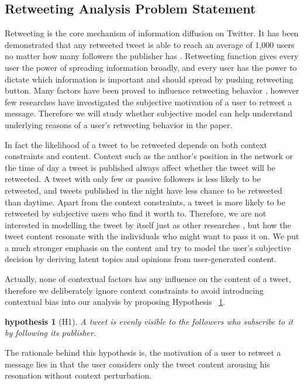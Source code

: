 \documentclass{acm_proc_article-sp}
\newtheorem{hypothesis}{hypothesis}
\begin{document}
\subsection{Retweeting Analysis Problem Statement}
\label{statement}
Retweeting is the core mechanism of information diffusion on Twitter. It has been demonstrated that any retweeted tweet is able to reach an average of 1,000 users no matter how many followers the publisher has \cite{Kwak:2010TSN}. Retweeting function gives every user the power of spreading information broadly, and every user has the power to dictate which information is important and should spread by pushing retweeting button. Many factors have been proved to influence retweeting behavior \cite{Suh2010,conf/icwsm/MacskassyM11,Comarela:2012UFA}, however few researches have investigated the subjective motivation of a user to retweet a message. Therefore we will study whether subjective model can help understand underlying reasons of a user's retweeting behavior in the paper.

In fact the likelihood of a tweet to be retweeted depends on both context constraints and content. 
Context such as the author's position in the network or the time of day a tweet is published always affect whether the tweet will be retweeted. A tweet with only few or passive followers is less likely to be retweeted, and tweets published in the night have less chance to be retweeted than daytime.
Apart from the context constraints, a tweet is more likely to be retweeted by subjective users who find it worth to. Therefore, we are not interested in modelling the tweet by itself just as other researches \cite{Naveed:2011SMC,2011:NaveedGKC,conf/icwsm/PfitznerGS12}, but how the tweet content resonate with the individuals who might want to pass it on. We put a much stronger emphasis on the content and try to model the user's subjective decision by deriving latent topics and opinions from user-generated content. 
 
Actually, none of contextual factors has any influence on the content of a tweet, therefore we deliberately ignore context constraints to avoid introducing contextual bias into our analysis by proposing  Hypothesis ~\ref{hypothesis1}. 
\begin{hypothesis}[H1]
\label{hypothesis1}
A tweet is evenly visible to the followers who subscribe to it by following its publisher.
\end{hypothesis}
The rationale behind this hypothesis is, the motivation of a user to retweet a message lies in that the user considers only the tweet content arousing his resonation without context perturbation.
\end{document}
